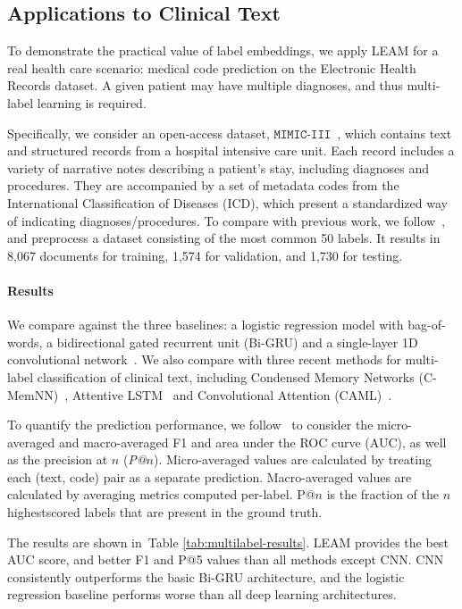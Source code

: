 \documentclass[11pt,a4paper]{article}
\begin{document}
\subsection{Applications to Clinical Text}
To demonstrate the practical value of label embeddings,
we apply LEAM for a real health care scenario: medical code prediction on the Electronic Health Records dataset. A given patient may have multiple diagnoses, and thus multi-label learning is required. 

Specifically, we consider an open-access dataset, $\mathtt{MIMIC}$-$\mathtt{III}$~\cite{johnson2016mimic}, which contains text and structured records from a hospital intensive care unit. 
Each record includes a variety of narrative notes describing a patient’s stay, including diagnoses and procedures. 
They are accompanied by a set of metadata codes from the International Classification of Diseases (ICD), which present a standardized way of indicating
diagnoses/procedures.
To compare with previous work, we follow~\cite{shi2017towards,mullenbach2018explainable}, and preprocess a dataset consisting of the most common 50 labels. It results in 8,067 documents for training, 1,574 for validation, and 1,730 for testing.


\paragraph{Results}

We compare against the three baselines: a logistic regression model with bag-of-words, a bidirectional gated recurrent unit (Bi-GRU) and a single-layer 1D convolutional network~\cite{kim2014convolutional}. We also compare with three recent methods for multi-label classification of clinical text, including Condensed Memory Networks (C-MemNN)~\cite{prakash2017condensed}, Attentive LSTM~\cite{shi2017towards} and Convolutional Attention (CAML)~\cite{mullenbach2018explainable}.

To quantify the prediction performance, we follow~\cite{mullenbach2018explainable} to consider the micro-averaged and macro-averaged F1 and area under the ROC curve (AUC), as well as the precision at $n$ ({\it P@$n$}). Micro-averaged values are calculated by treating each (text, code) pair as a separate prediction. Macro-averaged values are calculated by averaging metrics computed per-label. P@$n$ is the fraction of the $n$ highestscored labels that are present in the ground truth.

The results are shown in~Table \ref{tab:multilabel-results}. LEAM provides the best AUC score, and better F1 and P@5 values than all methods except CNN. CNN consistently outperforms the basic Bi-GRU architecture, and the logistic regression baseline performs worse than all deep learning architectures.
\end{document}
